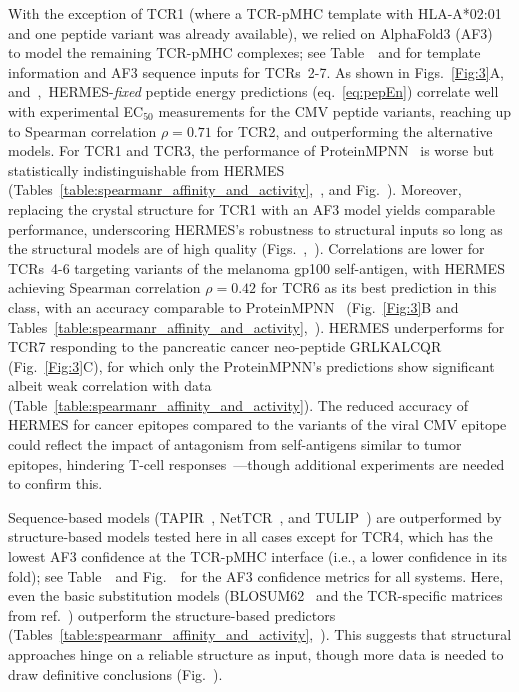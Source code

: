 With the exception of TCR1 (where a TCR-pMHC template with HLA-A*02:01 and one peptide variant was
already available), we relied on AlphaFold3 (AF3)~\cite{Abramson2024-jp} to model the remaining
TCR-pMHC complexes; see Table~\AffActInfoTable~and for template information
and AF3 sequence inputs for TCRs~2-7. {As shown in Figs.~\ref{Fig:3}A,
and~\ActivityHeatmapsFigure,~HERMES-{\em fixed} peptide energy predictions (eq.~\ref{eq:pepEn})
correlate well with experimental EC$_{50}$ measurements for the CMV peptide variants, reaching up to
Spearman correlation $\rho= 0.71$ for TCR2, and outperforming the alternative models. For TCR1 and
TCR3, the performance of ProteinMPNN~\cite{Dauparas2022-fu} is worse but statistically
indistinguishable from HERMES
(Tables~\ref{table:spearmanr_affinity_and_activity},~\SpearmanrActivityTable, and
Fig.~\ProteinMPNNScoringSchemesFigure). Moreover, replacing the crystal structure for TCR1 with an
AF3 model yields comparable performance, underscoring HERMES's robustness to structural inputs so
long as the structural models are of high quality
(Figs.~\AfExamplesFigure,~\AfScoringResultsFigure). Correlations are lower for TCRs~4-6 targeting
variants of the melanoma gp100 self-antigen, with HERMES achieving Spearman correlation
{$\rho=0.42$} for TCR6 as its best prediction in this class, with an accuracy comparable to
ProteinMPNN~\cite{Dauparas2022-fu} (Fig.~\ref{Fig:3}B {and
Tables~\ref{table:spearmanr_affinity_and_activity},~\SpearmanrActivityTable}).}
HERMES underperforms for TCR7 responding to the pancreatic cancer neo-peptide GRLKALCQR
(Fig.~\ref{Fig:3}C){, for which only the ProteinMPNN's predictions show significant albeit weak
correlation with data (Table~\ref{table:spearmanr_affinity_and_activity})}. The reduced accuracy of
HERMES for cancer epitopes compared to the variants of the viral CMV epitope could reflect the
impact of antagonism from self-antigens similar to tumor epitopes, hindering T-cell
responses~\cite{Altan-Bonnet2005-lm,Achar2022-tb}---though additional experiments are needed to
confirm this.

{Sequence-based models (TAPIR~\cite{Fast2023-tk}, NetTCR~\cite{Jensen2024-xs}, and
TULIP~\cite{Meynard-Piganeau2024-po}) are outperformed by structure-based models tested here in all
cases except for TCR4, which has the lowest AF3 confidence at the TCR-pMHC interface (i.e., a lower
confidence in its fold); see Table~\AfMetricsTable~and Fig.~\AfScoringResultsFigure~for the AF3
confidence metrics for all systems. Here, even the basic substitution models
(BLOSUM62~\cite{Henikoff1992-jq} and the TCR-specific matrices from ref.~\cite{Luksza2022-gx})
outperform the structure-based predictors
(Tables~\ref{table:spearmanr_affinity_and_activity},~\SpearmanrActivityTable). This suggests
that structural approaches hinge on a reliable structure as input, though more data is needed to
draw definitive conclusions (Fig.~\AfScoringResultsFigure).
}

